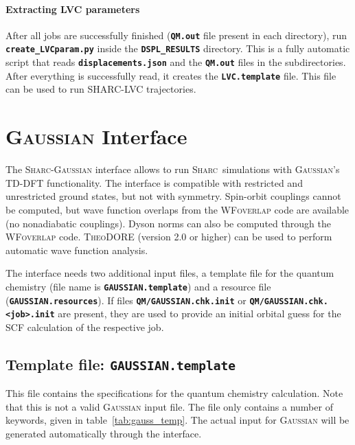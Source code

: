 \documentclass[a4paper,10pt,DIV=15,openany]{scrbook}
\newcommand{\tthdump}[1]{#1}
\newcommand{\sharc}{\textsc{Sharc}}
\newcommand{\ttt}[1]{\textbf{\texttt{#1}}}
\begin{document}
\paragraph{Extracting LVC parameters}

After all jobs are successfully finished (\ttt{QM.out} file present in each directory), run \ttt{create\_LVCparam.py} inside the \ttt{DSPL\_RESULTS} directory.
This is a fully automatic script that reads \ttt{displacements.json} and the \ttt{QM.out} files in the subdirectories.
After everything is successfully read, it creates the \ttt{LVC.template} file.
This file can be used to run SHARC-LVC trajectories.




\tthdump{\FloatBarrier}
\section{\textsc{Gaussian} Interface}\label{sec:int:gaussian}

The \sharc-\textsc{Gaussian} interface allows to run \sharc\ simulations with \textsc{Gaussian}'s TD-DFT functionality.
The interface is compatible with restricted and unrestricted ground states, but not with symmetry.
Spin-orbit couplings cannot be computed, but wave function overlaps from the \textsc{WFoverlap} code are available (no nonadiabatic couplings).
Dyson norms can also be computed through the \textsc{WFoverlap} code.
\textsc{TheoDORE} (version 2.0 or higher) can be used to perform automatic wave function analysis.

The interface needs two additional input files, a template file for the quantum chemistry (file name is \ttt{GAUSSIAN.template}) and a resource file (\ttt{GAUSSIAN.resources}). 
If files \ttt{QM/GAUSSIAN.chk.init} or \ttt{QM/GAUSSIAN.chk.<job>.init} are present, they are used to provide an initial orbital guess for the SCF calculation of the respective job.

\subsection{Template file: \ttt{GAUSSIAN.template}}

This file contains the specifications for the quantum chemistry calculation. Note that this is not a valid \textsc{Gaussian} input file. The file only contains a number of keywords, given in table~\ref{tab:gauss_temp}. The actual input for \textsc{Gaussian} will be generated automatically through the interface.
\end{document}
